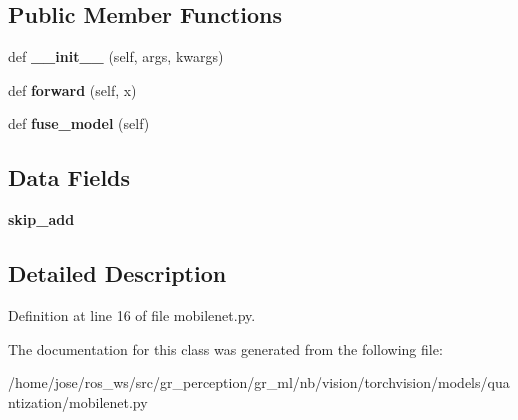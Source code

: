 \subsection*{Public Member Functions}
\begin{DoxyCompactItemize}
\item 
\mbox{\label{classtorchvision_1_1models_1_1quantization_1_1mobilenet_1_1QuantizableInvertedResidual_a658cb13f6b6611a6257b784f93748513}} 
def {\bfseries \+\_\+\+\_\+init\+\_\+\+\_\+} (self, args, kwargs)
\item 
\mbox{\label{classtorchvision_1_1models_1_1quantization_1_1mobilenet_1_1QuantizableInvertedResidual_a548fe0f2884f1dc24d3a004a80519545}} 
def {\bfseries forward} (self, x)
\item 
\mbox{\label{classtorchvision_1_1models_1_1quantization_1_1mobilenet_1_1QuantizableInvertedResidual_a75f7be780ec7b41d42db95df6e1443e1}} 
def {\bfseries fuse\+\_\+model} (self)
\end{DoxyCompactItemize}
\subsection*{Data Fields}
\begin{DoxyCompactItemize}
\item 
\mbox{\label{classtorchvision_1_1models_1_1quantization_1_1mobilenet_1_1QuantizableInvertedResidual_a8a21e6921b2aca00276731c02fa93106}} 
{\bfseries skip\+\_\+add}
\end{DoxyCompactItemize}


\subsection{Detailed Description}


Definition at line 16 of file mobilenet.\+py.



The documentation for this class was generated from the following file\+:\begin{DoxyCompactItemize}
\item 
/home/jose/ros\+\_\+ws/src/gr\+\_\+perception/gr\+\_\+ml/nb/vision/torchvision/models/quantization/mobilenet.\+py\end{DoxyCompactItemize}
